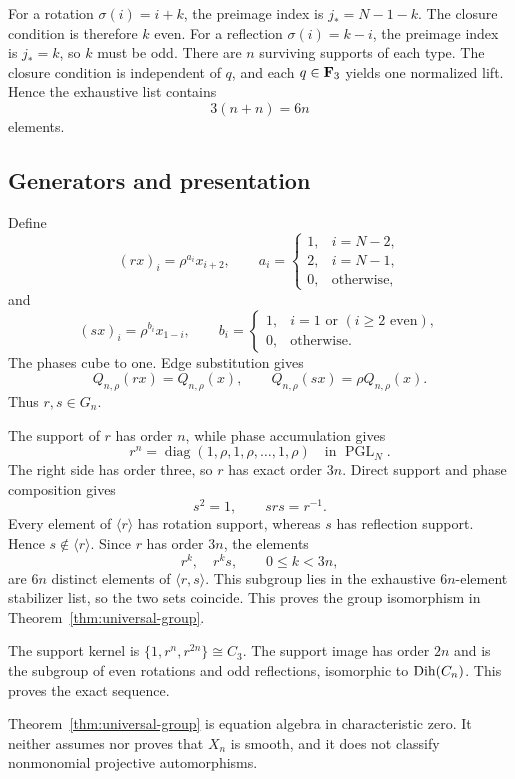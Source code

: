 For a rotation \(\sigma(i)=i+k\), the preimage index is
\(j_*=N-1-k\).  The closure condition is therefore \(k\) even.  For a
reflection \(\sigma(i)=k-i\), the preimage index is \(j_*=k\), so \(k\)
must be odd.  There are \(n\) surviving supports of each type.  The closure
condition is independent of \(q\), and each \(q\in\mathbf F_3\) yields one
normalized lift.  Hence the exhaustive list contains
\begin{equation}
3(n+n)=6n
\label{eq:group-count}
\end{equation}
elements.

\subsection{Generators and presentation}

Define
\begin{equation}
(rx)_i=\rho^{a_i}x_{i+2},\qquad
a_i=
\begin{cases}
1,&i=N-2,\\
2,&i=N-1,\\
0,&\text{otherwise},
\end{cases}
\label{eq:r-generator}
\end{equation}
and
\begin{equation}
(sx)_i=\rho^{b_i}x_{1-i},\qquad
b_i=
\begin{cases}
1,&i=1\text{ or }(i\ge2\text{ even}),\\
0,&\text{otherwise}.
\end{cases}
\label{eq:s-generator}
\end{equation}
The phases cube to one.  Edge substitution gives
\[
Q_{n,\rho}(rx)=Q_{n,\rho}(x),\qquad
Q_{n,\rho}(sx)=\rho Q_{n,\rho}(x).
\]
Thus \(r,s\in G_n\).

The support of \(r\) has order \(n\), while phase accumulation gives
\begin{equation}
r^n=\operatorname{diag}(1,\rho,1,\rho,\ldots,1,\rho)
\quad\text{in }\operatorname{PGL}_N.
\label{eq:r-power-n}
\end{equation}
The right side has order three, so \(r\) has exact order \(3n\).
Direct support and phase composition gives
\[
s^2=1,\qquad srs=r^{-1}.
\]
Every element of \(\langle r\rangle\) has rotation support, whereas \(s\)
has reflection support.  Hence \(s\notin\langle r\rangle\).  Since \(r\)
has order \(3n\), the elements
\[
r^k,\quad r^ks,\qquad 0\le k<3n,
\]
are \(6n\) distinct elements of \(\langle r,s\rangle\).  This subgroup
lies in the exhaustive \(6n\)-element stabilizer list, so the two sets
coincide.
This proves the group isomorphism in
Theorem~\ref{thm:universal-group}.

The support kernel is
\(\{1,r^n,r^{2n}\}\cong C_3\).  The support image has order \(2n\) and
is the subgroup of even rotations and odd reflections, isomorphic to
\(\operatorname{Dih}(C_n)\).  This proves the exact sequence.

\begin{remark}
Theorem~\ref{thm:universal-group} is equation algebra in characteristic
zero.  It neither assumes nor proves that \(X_n\) is smooth, and it does not
classify nonmonomial projective automorphisms.
\end{remark}
